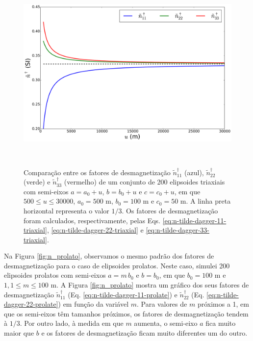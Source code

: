 \begin{figure}[hbt!]
	\centering \includegraphics[width=15cm,height=10cm]{figures/test_n_triaxial}
	\caption[Comparação entre os fatores de desmagnetização
	$\tilde{n}^{\dagger}_{11}$ (azul), $\tilde{n}^{\dagger}_{22}$ (verde) e $\tilde{n}^{\dagger}_{33}$ (vermelho) de um conjunto de 200 elipsoides triaxiais com semi-eixos $a = a_0 + u$, $b = b_0 + u$ e $c = c_0 + u$, em que $500 \le u \le 30000$, $a_0 = 500$ m, $b_0 = 100$ m e $c_0 = 50$ m. A linha preta horizontal representa o valor $1/3$. Os fatores de desmagnetização foram calculados, respectivamente, pelas Eqs. \ref{eq:n-tilde-dagger-11-triaxial}, \ref{eq:n-tilde-dagger-22-triaxial} e \ref{eq:n-tilde-dagger-33-triaxial}.]{Comparação entre os fatores de desmagnetização
		$\tilde{n}^{\dagger}_{11}$ (azul), $\tilde{n}^{\dagger}_{22}$ (verde) e $\tilde{n}^{\dagger}_{33}$ (vermelho) de um conjunto de 200 elipsoides triaxiais com semi-eixos $a = a_0 + u$, $b = b_0 + u$ e $c = c_0 + u$, em que $500 \le u \le 30000$, $a_0 = 500$ m, $b_0 = 100$ m e $c_0 = 50$ m. A linha preta horizontal representa o valor $1/3$. Os fatores de desmagnetização foram calculados, respectivamente, pelas Eqs. \ref{eq:n-tilde-dagger-11-triaxial}, \ref{eq:n-tilde-dagger-22-triaxial} e \ref{eq:n-tilde-dagger-33-triaxial}.}
	\label{fig:n_triaxial}
\end{figure}

Na Figura \ref{fig:n_prolato}, observamos o mesmo padrão dos fatores de desmagnetização para o caso de elipsoides prolatos. Neste caso, simulei 200 elipsoides prolatos com semi-eixos $a=m\, b_0$ e $b=b_0$, em que $b_0=100$ m e $1,1 \le m \le 100$ m. A Figura \ref{fig:n_prolato} mostra um gráfico dos seus fatores de desmagnetização $\tilde{n}^{\dagger}_{11}$ (Eq. \ref{eq:n-tilde-dagger-11-prolate}) e $\tilde{n}^{\dagger}_{22}$ (Eq. \ref{eq:n-tilde-dagger-22-prolate}) em função da variável $m$.
Para valores de $m$ próximos a 1, em que os semi-eixos têm tamanhos próximos, os fatores de desmagnetização tendem à $1/3$. Por outro lado, à medida em que $m$ aumenta, o semi-eixo $a$ fica muito maior que $b$ e os fatores de desmagnetização ficam muito diferentes um do outro.

